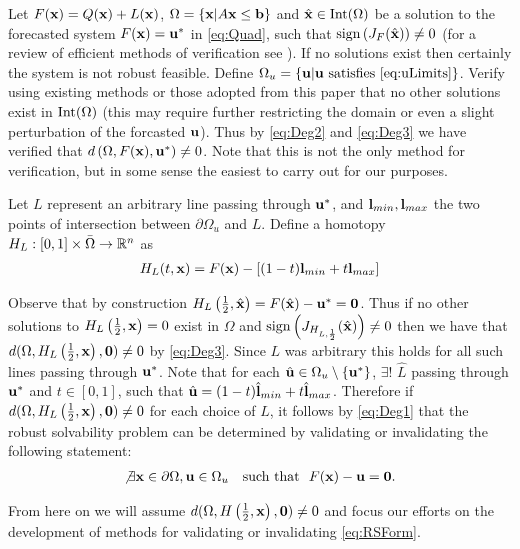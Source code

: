 Let $F(\mathbf{x})=Q(\mathbf{x})+L(\mathbf{x})$, $\Omega=\{\mathbf{x}| A\mathbf{x} \leq \mathbf{b}\}$ and $\hat{\mathbf{x}}\in \operatorname{Int}(\Omega)$ be a solution to the forecasted system $F(\mathbf{x})=\mathbf{u}^*$ in \ref{eq:Quad}, such that $\operatorname{sign}\left(J_{F}(\hat{\mathbf{x}})\right)\neq 0$ (for a review of efficient methods of verification see \cite{GRIEWANK2014}). 
If no solutions exist then certainly the system is not robust feasible. Define $\Omega_u=\{\mathbf{u}| \mathbf{u}\text{ satisfies }\ref{eq:uLimits}\}$.
Verify using existing methods or those adopted from this paper that no other solutions exist in $\operatorname{Int}(\Omega)$ (this may require further restricting the domain or even a slight perturbation of the forcasted $\mathbf{u}$). 
Thus by \ref{eq:Deg2} and \ref{eq:Deg3} we have verified that $d\left(\Omega, F(\mathbf{x}), \mathbf{u}^*\right)\neq 0$. 
Note that this is not the only method for verification, but in some sense the easiest to carry out for our purposes. 

Let $L$ represent an arbitrary line passing through $\mathbf{u}^*$, and $\mathbf{l}_{min},\mathbf{l}_{max}$ the two points of intersection between $\partial\Omega_u$ and $L$. 
Define a homotopy $H_L : [0,1]\times\bar{\Omega}\rightarrow\mathbb{R}^n$ as 
\begin{align}
H_L(t,\mathbf{x}) = F(\mathbf{x})-\left[(1-t)\mathbf{l}_{min}+t\mathbf{l}_{max}\right] \label{eq:Homo}
\end{align}

Observe that by construction $H_L\left(\frac{1}{2},\hat{\mathbf{x}}\right)=F(\hat{\mathbf{x}})-\mathbf{u}^*=\textbf{0}$. 
Thus if no other solutions to $H_L\left(\frac{1}{2},\mathbf{x}\right)=0$ exist in $\Omega$ and $\operatorname{sign}\left(J_{H_{L,\frac{1}{2}}}(\hat{\mathbf{x}})\right)\neq 0$ then we have that $d(\Omega,H_L\left(\frac{1}{2},\mathbf{x}\right),\textbf{0})\neq 0$ by \ref{eq:Deg3}. 
Since $L$ was arbitrary this holds for all such lines passing through $\mathbf{u}^*$.
Note that for each $\hat{\mathbf{u}}\in\Omega_u\setminus\{\mathbf{u}^*\}$, $\exists !$ $\hat{L}$ passing through $\mathbf{u}^*$ and $t\in[0,1]$,  such that $\hat{\mathbf{u}}=(1-t)\hat{\mathbf{l}}_{min}+t\hat{\mathbf{l}}_{max}$. 
Therefore if $d(\Omega,H_L\left(\frac{1}{2},\mathbf{x}\right),\mathbf{0})\neq 0$ for each choice of $L$, it follows by \ref{eq:Deg1} that the robust solvability problem can be determined by validating or invalidating the following statement:
\begin{align}
\not\exists \mathbf{x}\in\partial\Omega, \mathbf{u}\in\Omega_u \ \ \mbox{ such that } \ F(\mathbf{x})-\mathbf{u}=\mathbf{0}. \label{eq:RSForm}
\end{align}

From here on we will assume $d(\Omega,H\left(\frac{1}{2},\mathbf{x}\right),\mathbf{0})\neq 0$ and focus our efforts on the development of methods for validating or invalidating \ref{eq:RSForm}.


